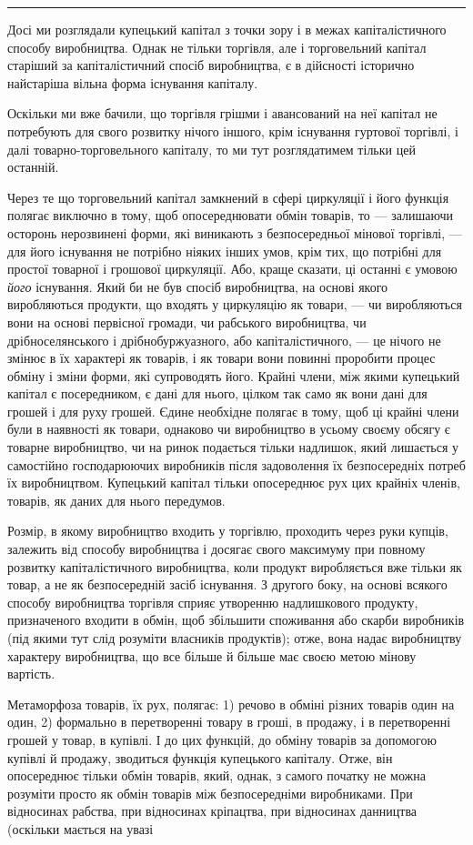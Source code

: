 \pfbreak{}

Досі ми розглядали купецький капітал з точки зору і в межах
капіталістичного способу виробництва. Однак не тільки торгівля,
але і торговельний капітал старіший за капіталістичний
спосіб виробництва, є в дійсності історично найстаріша
вільна форма існування капіталу.

Оскільки ми вже бачили, що торгівля грішми і авансований
на неї капітал не потребують для свого розвитку нічого іншого,
крім існування гуртової торгівлі, і далі товарно-торговельного
капіталу, то ми тут розглядатимем тільки цей останній.

Через те що торговельний капітал замкнений в сфері циркуляції
і його функція полягає виключно в тому, щоб опосереднювати
обмін товарів, то — залишаючи осторонь нерозвинені форми,
які виникають з безпосередньої мінової торгівлі, — для його існування
не потрібно ніяких інших умов, крім тих, що потрібні для
простої товарної і грошової циркуляції. Або, краще сказати, ці
останні є умовою \emph{його} існування. Який би не був спосіб виробництва,
на основі якого виробляються продукти, що входять
у циркуляцію як товари, — чи виробляються вони на основі первісної
громади, чи рабського виробництва, чи дрібноселянського
і дрібнобуржуазного, або капіталістичного, — це нічого не змінює
в їх характері як товарів, і як товари вони повинні проробити
процес обміну і зміни форми, які супроводять його. Крайні
члени, між якими купецький капітал є посередником, є дані для
нього, цілком так само як вони дані для грошей і для руху грошей.
Єдине необхідне полягає в тому, щоб ці крайні члени були
в наявності як товари, однаково чи виробництво в усьому своєму
обсягу є товарне виробництво, чи на ринок подається тільки
надлишок, який лишається у самостійно господарюючих виробників
після задоволення їх безпосередніх потреб їх виробництвом.
Купецький капітал тільки опосереднює рух цих крайніх членів,
товарів, як даних для нього передумов.

Розмір, в якому виробництво входить у торгівлю, проходить
через руки купців, залежить від способу виробництва і досягає
свого максимуму при повному розвитку капіталістичного
виробництва, коли продукт виробляється вже тільки як товар,
а не як безпосередній засіб існування. З другого боку, на основі
всякого способу виробництва торгівля сприяє утворенню надлишкового
продукту, призначеного входити в обмін, щоб збільшити
споживання або скарби виробників (під якими тут слід
розуміти власників продуктів); отже, вона надає виробництву
характеру виробництва, що все більше й більше має своєю метою
мінову вартість.

Метаморфоза товарів, їх рух, полягає: 1) речово в обміні
різних товарів один на один, 2) формально в перетворенні товару
в гроші, в продажу, і в перетворенні грошей у товар,
в купівлі. І до цих функцій, до обміну товарів за допомогою
купівлі й продажу, зводиться функція купецького капіталу. Отже,
він опосереднює тільки обмін товарів, який, однак, з самого початку
не можна розуміти просто як обмін товарів між безпосередніми
виробниками. При відносинах рабства, при відносинах
кріпацтва, при відносинах данництва (оскільки мається на увазі
\parbreak{}  %

